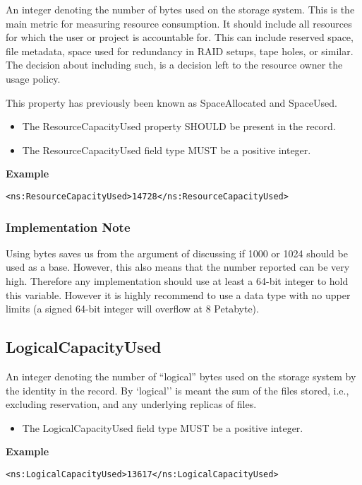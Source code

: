 An integer denoting the number of bytes used on the storage system. This is the
main metric for measuring resource consumption. It should include all resources
for which the user or project is accountable for. This can include reserved
space, file metadata, space used for redundancy in RAID setups, tape holes,
or similar. The decision about including such, is a decision left to the
resource owner the usage policy.

This property has previously been known as SpaceAllocated and SpaceUsed.

\begin{itemize}
\item The ResourceCapacityUsed property SHOULD be present in the record.
\item The ResourceCapacityUsed field type MUST be a positive integer.
\end{itemize}

{\bf Example}
\begin{verbatim}
<ns:ResourceCapacityUsed>14728</ns:ResourceCapacityUsed>
\end{verbatim}

\subsubsection*{Implementation Note}

Using bytes saves us from the argument of discussing if 1000 or 1024 should be
used as a base. However, this also means that the number reported can be very
high. Therefore any implementation should use at least a 64-bit integer to hold
this variable. However it is highly recommend to use a data type with no upper
limits (a signed 64-bit integer will overflow at 8 Petabyte).


\subsection{LogicalCapacityUsed}

An integer denoting the number of ``logical'' bytes used on the storage system
by the identity in the record. By `logical'' is meant the sum of the files
stored, i.e., excluding reservation, and any underlying replicas of files.

\begin{itemize}
\item The LogicalCapacityUsed field type MUST be a positive integer.
\end{itemize}

{\bf Example}
\begin{verbatim}
<ns:LogicalCapacityUsed>13617</ns:LogicalCapacityUsed>
\end{verbatim}

